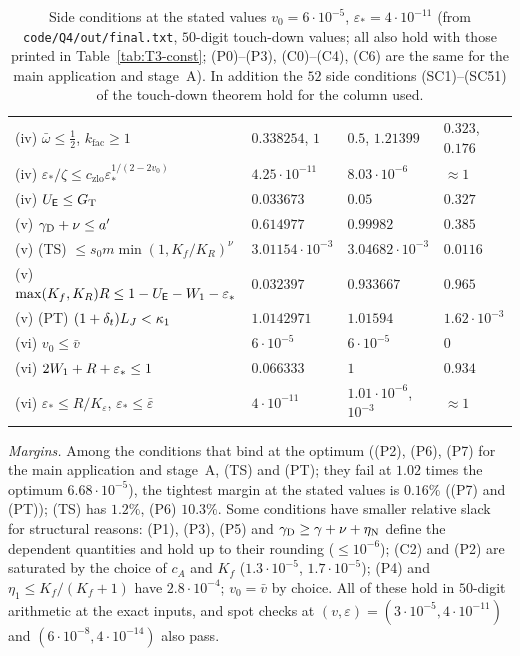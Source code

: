 \begin{table}[p]
\begin{tabular}{@{}llll@{}}
(iv) $\bar\omega\le\frac12$, $k_{\mathrm{fac}}\ge1$ & $0.338254$, $1$ & $0.5$, $1.21399$ & $0.323$, $0.176$\\
(iv) $\varepsilon_*/\zeta\le c_{\mathrm{zlo}}\varepsilon_*^{1/(2-2v_0)}$ & $4.25\cdot10^{-11}$ & $8.03\cdot10^{-6}$ & $\approx1$\\
(iv) $U_{\mathsf E}\le G_{\mathrm T}$ & $0.033673$ & $0.05$ & $0.327$\\
(v) $\gamma_{\mathrm D}+\nu\le a'$ & $0.614977$ & $0.99982$ & $0.385$\\
(v) (TS) $\le s_0m\min(1,K_f/K_R)^\nu$ & $3.01154\cdot10^{-3}$ & $3.04682\cdot10^{-3}$ & $0.0116$\\
(v) $\max(K_f,K_R)R\le1-U_{\mathsf E}-W_1-\varepsilon_*$ & $0.032397$ & $0.933667$ & $0.965$\\
(v) (PT) $(1+\delta_t)L_J<\kappa_1$ & $1.0142971$ & $1.01594$ & $1.62\cdot10^{-3}$\\
(vi) $v_0\le\bar v$ & $6\cdot10^{-5}$ & $6\cdot10^{-5}$ & $0$\\
(vi) $2W_1+R+\varepsilon_*\le1$ & $0.066333$ & $1$ & $0.934$\\
(vi) $\varepsilon_*\le R/K_\varepsilon$, $\varepsilon_*\le\bar\varepsilon$ & $4\cdot10^{-11}$ & $1.01\cdot10^{-6}$, $10^{-3}$ & $\approx1$\\
\bottomrule
\end{tabular}
\caption{Side conditions at the stated values $v_0=6\cdot10^{-5}$, $\varepsilon_*=4\cdot10^{-11}$ (from
\texttt{code/Q4/out/final.txt}, $50$-digit touch-down values; all also hold with those printed in Table~\ref{tab:T3-const}; (P0)--(P3), (C0)--(C4), (C6) are the same for the main application and stage~A). In addition the
$52$ side conditions (SC1)--(SC51) of the touch-down theorem hold for the column used.}\label{tab:T3-side}
\end{table}

\noindent\emph{Margins.} Among the conditions that bind at the optimum ((P2), (P6), (P7) for the main application and stage~A,
(TS) and (PT); they fail at $1.02$ times the optimum $6.68\cdot10^{-5}$), the tightest margin at the stated values is $0.16\%$
((P7) and (PT)); (TS) has $1.2\%$, (P6) $10.3\%$. Some conditions have smaller relative slack for structural reasons: (P1), (P3),
(P5) and $\gamma_{\mathrm D}\ge\gamma+\nu+\eta_{\mathrm N}$ define the dependent quantities and hold up to their rounding ($\le10^{-6}$); (C2) and
(P2) are saturated by the choice of $c_A$ and $K_f$ ($1.3\cdot10^{-5}$, $1.7\cdot10^{-5}$); (P4) and $\eta_1\le K_f/(K_f+1)$ have
$2.8\cdot10^{-4}$; $v_0=\bar v$ by choice. All of these hold in $50$-digit arithmetic at the exact inputs, and spot checks at
$(v,\varepsilon)=(3\cdot10^{-5},4\cdot10^{-11})$ and $(6\cdot10^{-8},4\cdot10^{-14})$ also pass.

